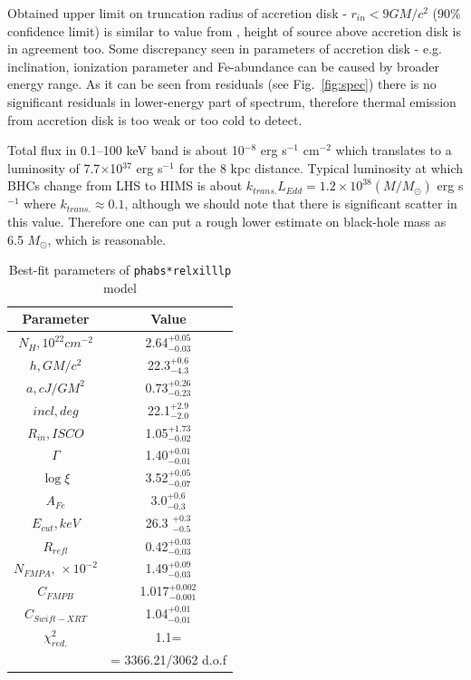 \documentclass[a4paper,fleqn,usenatbib]{mnras}
\begin{document}
Obtained upper limit on truncation radius of accretion disk - $r_{in} < 9 GM/c^{2}$ (90\% confidence limit) is similar to value from \cite{miller15_nust}, height of source above accretion disk is in agreement too. Some discrepancy seen in parameters of accretion disk - e.g. inclination, ionization parameter and Fe-abundance can be caused by broader energy range. As it can be seen from residuals (see Fig.~\ref{fig:spec}) there is no significant residuals in lower-energy part of spectrum, therefore thermal emission from accretion disk is too weak or too cold to detect. 

Total flux in 0.1--100 keV band is about 10$^{-8}$ erg s$^{-1}$ cm$^{-2}$ which translates to a luminosity of 7.7$\times$10$^{37}$ erg s$^{-1}$ for the 8 kpc distance. Typical luminosity at which BHCs change from LHS to HIMS is about $k_{trans.} L_{Edd} = 1.2\times10^{38} (M/M_{\odot})$ erg s$^{-1}$ where $k_{trans.} \approx 0.1$, although we should note that there is significant scatter in this value. Therefore one can put a rough lower estimate on black-hole mass as 6.5 $M_{\odot}$, which is reasonable.

\begin{table}
\noindent
\centering
\caption{Best-fit parameters of \texttt{phabs*relxilllp} model}
\label{tab:fullfit}
\centering
\begin{tabular}{|c|c|}
\hline\hline
Parameter & Value \\
\hline
$N_{H}, 10^{22} cm^{-2}$ &   2.64$^{+0.05}_{-0.03}$ \\   
$h, GM/c^{2}$   &  22.3$^{+0.6}_{-4.3}$ \\
$a, cJ/GM^{2}$    & 0.73$^{+0.26}_{-0.23}$   \\
$incl, deg$ & 22.1$^{+2.9}_{-2.0}$ \\
$R_{in}, ISCO$  & 1.05$^{+1.73}_{-0.02}$ \\ 
$\Gamma$& 1.40$^{+0.01}_{-0.01}$   \\
$\log{\xi}$ &  3.52$^{+0.05}_{-0.07}$ \\
$A_{Fe}$   &  3.0$^{+0.6}_{-0.3}$  \\        
$E_{cut}, keV$    &       26.3 $^{+0.3}_{-0.5}$    \\
$R_{refl}$  &         0.42$^{+0.03}_{-0.03}$    \\
$N_{FMPA},\,\times10^{-2}$          &      1.49$^{+0.09}_{-0.03}$ \\
$C_{FMPB}$ & 1.017$^{+0.002}_{-0.001}$    \\
$C_{Swift-XRT}$    &   1.04$^{+0.01}_{-0.01}$\\
$\chi^{2}_{red.}$    &   1.1=\\ 
              &= 3366.21/3062 d.o.f\\
              
\hline
\end{tabular}
\end{table}
\end{document}
